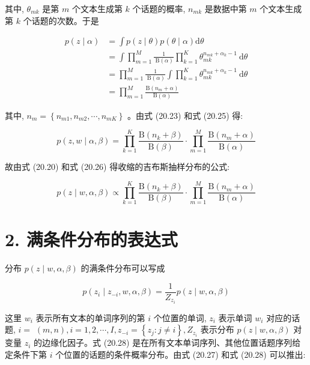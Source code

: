 \documentclass[10pt]{article}
\begin{document}
\begin{CJK*}{UTF8}{bsmi}
其中, $\theta_{m k}$ 是第 $m$ 个文本生成第 $k$ 个话题的概率, $n_{m k}$ 是数据中第 $m$ 个文本生成第 $k$ 个话题的次数。于是


\begin{align*}
p(z \mid \alpha) & =\int p(z \mid \theta) p(\theta \mid \alpha) \mathrm{d} \theta \\
& =\int \prod_{m=1}^{M} \frac{1}{\mathrm{~B}(\alpha)} \prod_{k=1}^{K} \theta_{m k}^{n_{m k}+\alpha_{k}-1} \mathrm{~d} \theta \\
& =\prod_{m=1}^{M} \frac{1}{\mathrm{~B}(\alpha)} \int \prod_{k=1}^{K} \theta_{m k}^{n_{m k}+\alpha_{k}-1} \mathrm{~d} \theta \\
& =\prod_{m=1}^{M} \frac{\mathrm{B}\left(n_{m}+\alpha\right)}{\mathrm{B}(\alpha)} \tag{20.25}
\end{align*}


其中, $n_{m}=\left\{n_{m 1}, n_{m 2}, \cdots, n_{m K}\right\}$ 。由式 (20.23) 和式 (20.25) 得:


\begin{equation*}
p(z, w \mid \alpha, \beta)=\prod_{k=1}^{K} \frac{\mathrm{B}\left(n_{k}+\beta\right)}{\mathrm{B}(\beta)} \cdot \prod_{m=1}^{M} \frac{\mathrm{B}\left(n_{m}+\alpha\right)}{\mathrm{B}(\alpha)} \tag{20.26}
\end{equation*}


故由式 (20.20) 和式 (20.26) 得收缩的吉布斯抽样分布的公式:


\begin{equation*}
p(z \mid w, \alpha, \beta) \propto \prod_{k=1}^{K} \frac{\mathrm{B}\left(n_{k}+\beta\right)}{\mathrm{B}(\beta)} \cdot \prod_{m=1}^{M} \frac{\mathrm{B}\left(n_{m}+\alpha\right)}{\mathrm{B}(\alpha)} \tag{20.27}
\end{equation*}


\section*{2. 满条件分布的表达式}
分布 $p(z \mid w, \alpha, \beta)$ 的满条件分布可以写成


\begin{equation*}
p\left(z_{i} \mid z_{-i}, w, \alpha, \beta\right)=\frac{1}{Z_{z_{i}}} p(z \mid w, \alpha, \beta) \tag{20.28}
\end{equation*}


这里 $w_{i}$ 表示所有文本的单词序列的第 $i$ 个位置的单词, $z_{i}$ 表示单词 $w_{i}$ 对应的话题, $i=$ $(m, n), i=1,2, \cdots, I, z_{-i}=\left\{z_{j}: j \neq i\right\}, Z_{z_{i}}$ 表示分布 $p(z \mid w, \alpha, \beta)$ 对变量 $z_{i}$ 的边缘化因子。式 (20.28) 是在所有文本单词序列、其他位置话题序列给定条件下第 $i$ 个位置的话题的条件概率分布。由式 (20.27) 和式 (20.28) 可以推出:



\end{CJK*}
\end{document}
